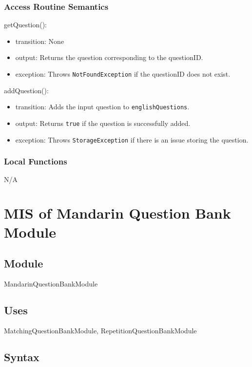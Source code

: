 \documentclass[12pt, titlepage]{article}
\begin{document}
\subsubsection{Access Routine Semantics}

\noindent getQuestion():
\begin{itemize}
\item transition: None
\item output: Returns the question corresponding to the questionID.
\item exception: Throws \texttt{NotFoundException} if the questionID does not exist.
\end{itemize}

\noindent addQuestion():
\begin{itemize}
\item transition: Adds the input question to \texttt{englishQuestions}.
\item output: Returns \texttt{true} if the question is successfully added.
\item exception: Throws \texttt{StorageException} if there is an issue storing the question.
\end{itemize}

\subsubsection{Local Functions}

N/A

\section{MIS of Mandarin Question Bank Module} \label{MandarinQuestionBankModule}

\subsection{Module}

MandarinQuestionBankModule

\subsection{Uses}

MatchingQuestionBankModule, RepetitionQuestionBankModule

\subsection{Syntax}
\end{document}
